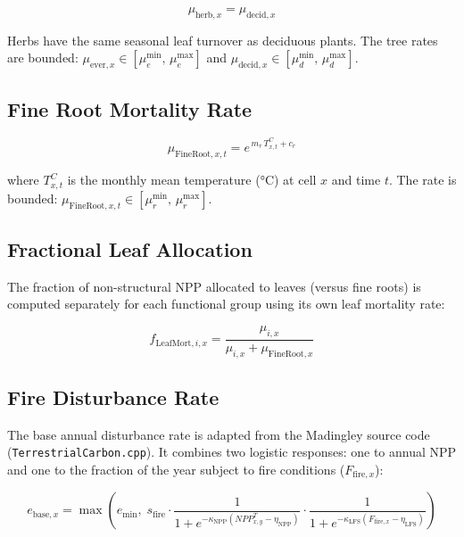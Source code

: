 \documentclass[12pt]{article}
\begin{document}
\begin{equation}
    \mu_{\mathrm{herb},x} = \mu_{\mathrm{decid},x}
    \label{eq:mu_herb}
\end{equation}

Herbs have the same seasonal leaf turnover as deciduous plants. The tree rates are
bounded: $\mu_{\mathrm{ever},x} \in [\mu^{\min}_{e},\,\mu^{\max}_{e}]$ and
$\mu_{\mathrm{decid},x} \in [\mu^{\min}_{d},\,\mu^{\max}_{d}]$.

\subsection{Fine Root Mortality Rate}

\begin{equation}
    \mu_{\mathrm{FineRoot},x,t} = e^{\,m_r\,T^C_{x,t} + c_r}
    \label{eq:mu_froot}
\end{equation}

where $T^C_{x,t}$ is the monthly mean temperature (°C) at cell $x$ and time $t$.
The rate is bounded: $\mu_{\mathrm{FineRoot},x,t} \in [\mu^{\min}_{r},\,\mu^{\max}_{r}]$.

\subsection{Fractional Leaf Allocation}

The fraction of non-structural NPP allocated to leaves (versus fine roots) is computed
separately for each functional group using its own leaf mortality rate:

\begin{equation}
    f_{\mathrm{LeafMort},i,x} = \frac{\mu_{i,x}}{\mu_{i,x} + \mu_{\mathrm{FineRoot},x}}
    \label{eq:fleafmort}
\end{equation}

\subsection{Fire Disturbance Rate}

The base annual disturbance rate is adapted from the Madingley source code
(\texttt{TerrestrialCarbon.cpp}). It combines two logistic responses: one to annual
NPP and one to the fraction of the year subject to fire conditions
($F_{\mathrm{fire},x}$):

\begin{equation}
    e_{\mathrm{base},x} = \max\!\left(e_{\min},\;
        s_{\mathrm{fire}} \cdot
        \frac{1}{1 + e^{-\kappa_{\mathrm{NPP}}\!\left(\mathit{NPP}^T_{x,y} - \eta_{\mathrm{NPP}}\right)}} \cdot
        \frac{1}{1 + e^{-\kappa_{\mathrm{LFS}}\!\left(F_{\mathrm{fire},x} - \eta_{\mathrm{LFS}}\right)}}
    \right)
    \label{eq:fire_base}
\end{equation}
\end{document}
